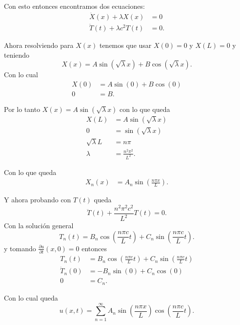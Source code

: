 \documentclass{report}
\begin{document}
Con esto entonces encontramos dos ecuaciones:
\begin{align*}
  \ddot{X}\left( x \right) + \lambda X\left( x \right) &= 0 \\
  \ddot{T}\left( t \right) + \lambda c^2 T\left( t \right) &= 0
.\end{align*}

Ahora resolviendo para $X\left( x \right) $ tenemos que usar $X\left( 0 \right) = 0$ y $X\left( L \right) = 0$ y teniendo \[
X\left( x \right) = A\sin\left( \sqrt{\lambda} x \right) + B \cos\left( \sqrt{\lambda} x \right)
.\] Con lo cual
\begin{align*}
  X\left( 0 \right) &= A\sin\left( 0 \right) + B \cos\left( 0 \right)  \\
  0 &= B
.\end{align*}

Por lo tanto $X\left( x \right) = A \sin\left( \sqrt{\lambda} x \right) $ con lo que queda
\begin{align*}
  X\left( L \right)  &= A \sin\left( \sqrt{\lambda} x \right)  \\
  0 &= \sin\left( \sqrt{\lambda} x \right)  \\
  \sqrt{\lambda} L &= n\pi \\
  \lambda &= \frac{n^2\pi^2}{L^2}
.\end{align*}

Con lo que queda
\begin{align*}
  X_n\left( x \right) &= A_n \sin\left( \frac{n\pi x}{L} \right) 
.\end{align*}

Y ahora probando con $T\left( t \right) $ queda \[
  \ddot{T}\left( t \right) + \frac{n^2\pi^2c^2}{L^2}T\left( t \right) = 0
.\] Con la solución general \[
T_n\left( t \right) = B_n \cos\left( \frac{n\pi c}{L}t \right) + C_n \sin\left( \frac{n\pi c}{L}t \right) 
.\] y tomando $\frac{\partial u}{\partial t} \left( x, 0 \right) = 0$ entonces
\begin{align*}
  T_n\left( t \right) &= B_n \cos\left( \frac{n\pi c}{L}t \right) + C_n \sin\left( \frac{n\pi c}{L}t \right) \\
\dot{T}_n\left( 0 \right) &= - B_n \sin\left( 0 \right) + C_n \cos\left( 0 \right)  \\
0 &= C_n
.\end{align*}

Con lo cual queda \[
u\left( x, t \right) = \sum_{n=1}^{\infty} A_n \sin\left( \frac{n\pi x}{L} \right) \cos\left( \frac{n \pi c}{L}t \right) 
.\] 
\end{document}
